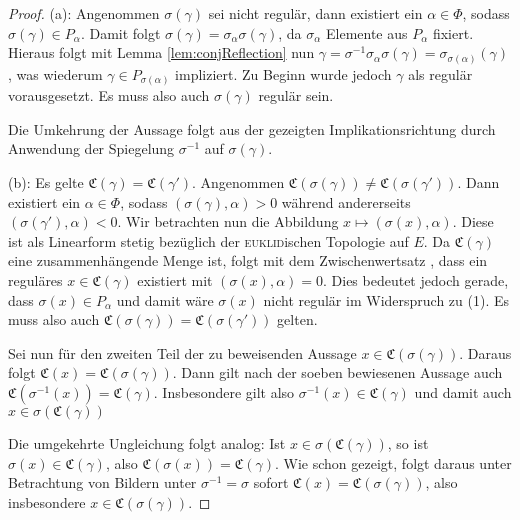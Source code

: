 \begin{proof}
  (a): 
  Angenommen $\sigma(\gamma)$ sei nicht regulär, dann existiert ein $\alpha \in \Phi$, sodass $\sigma(\gamma) \in P_\alpha$.
  Damit folgt $\sigma(\gamma) = \sigma_\alpha \sigma(\gamma)$, da $\sigma_\alpha$ Elemente aus $P_\alpha$ fixiert.
  Hieraus folgt mit Lemma \ref{lem:conjReflection} nun $\gamma = \sigma^{-1} \sigma_\alpha \sigma(\gamma) = \sigma_{\sigma(\alpha)}(\gamma)$, was wiederum $\gamma \in P_{\sigma(\alpha)}$ impliziert.
  Zu Beginn wurde jedoch $\gamma$ als regulär vorausgesetzt.
  Es muss also auch $\sigma(\gamma)$ regulär sein.
  
  Die Umkehrung der Aussage folgt aus der gezeigten Implikationsrichtung durch Anwendung der Spiegelung $\sigma^{-1}$ auf $\sigma(\gamma)$.

  (b): 
  Es gelte $\mathfrak{C}(\gamma) = \mathfrak{C}(\gamma')$.
  Angenommen $\mathfrak{C}(\sigma(\gamma)) \neq \mathfrak{C}(\sigma(\gamma'))$.
  Dann existiert ein $\alpha \in \Phi$, sodass $(\sigma(\gamma), \alpha) > 0$ während andererseits $(\sigma(\gamma'), \alpha) < 0$.
  Wir betrachten nun die Abbildung $x \mapsto  (\sigma(x), \alpha)$.
  Diese ist als Linearform stetig bezüglich der \textsc{euklid}ischen Topologie auf $E$.
  Da $\mathfrak{C}(\gamma)$ eine zusammenhängende Menge ist, folgt mit dem Zwischenwertsatz \cite[S.232]{bartsch2015allgemeine}, dass ein reguläres $x \in \mathfrak{C}(\gamma)$ existiert mit $(\sigma(x), \alpha) = 0$.
  Dies bedeutet jedoch gerade, dass $\sigma(x) \in P_\alpha$ und damit wäre $\sigma(x)$ nicht regulär im Widerspruch zu (1). Es muss also auch $\mathfrak{C}(\sigma(\gamma)) = \mathfrak{C}(\sigma(\gamma'))$ gelten.
  
  Sei nun für den zweiten Teil der zu beweisenden Aussage $x \in \mathfrak{C}(\sigma(\gamma))$.
  Daraus folgt $\mathfrak{C}(x) = \mathfrak{C}(\sigma(\gamma))$.
  Dann gilt nach der soeben bewiesenen Aussage auch $\mathfrak{C}(\sigma^{-1}(x)) = \mathfrak{C}(\gamma)$.
  Insbesondere gilt also $\sigma^{-1}(x) \in \mathfrak{C}(\gamma)$ und damit auch $x \in \sigma(\mathfrak{C}(\gamma))$
  
  Die umgekehrte Ungleichung folgt analog: Ist $x \in \sigma(\mathfrak{C}(\gamma))$, so ist $\sigma(x) \in \mathfrak{C}(\gamma)$, also $\mathfrak{C}(\sigma(x)) = \mathfrak{C}(\gamma)$. 
  Wie schon gezeigt, folgt daraus unter Betrachtung von Bildern unter $\sigma^{-1} = \sigma$ sofort $\mathfrak{C}(x) = \mathfrak{C}(\sigma(\gamma))$, also insbesondere $x \in \mathfrak{C}(\sigma(\gamma))$.


\end{proof}
